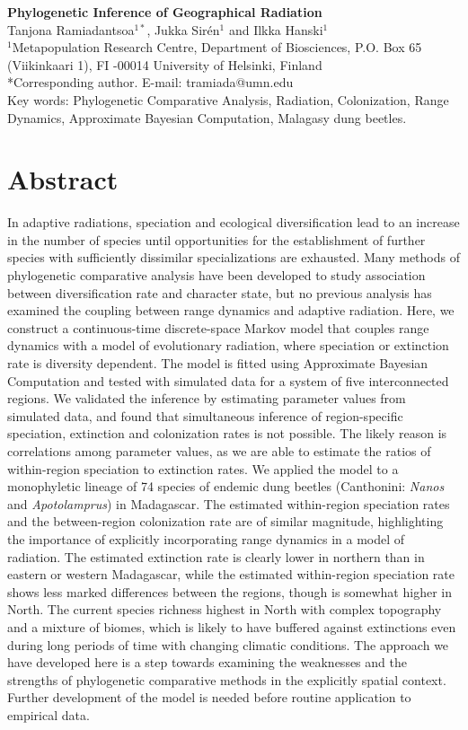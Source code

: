\begin{strip}
{
{\huge \bfseries Phylogenetic Inference of Geographical Radiation} \\ 

Tanjona Ramiadantsoa$^{1*}$, Jukka Sir{\'e}n$^1$ and Ilkka Hanski$^1$ \\

$^1$Metapopulation Research Centre, Department of Biosciences, P.O. Box 65 (Viikinkaari 1), FI -00014 University of Helsinki, Finland \\

*Corresponding author. E-mail: tramiada@umn.edu  \\

Key words: Phylogenetic Comparative Analysis, Radiation, Colonization, Range Dynamics, Approximate Bayesian Computation, Malagasy dung beetles. 
}
\section*{Abstract}
In adaptive radiations, speciation and ecological diversification lead to an increase in the number of species until opportunities for the establishment of further species with sufficiently dissimilar specializations are exhausted. 
Many methods of phylogenetic comparative analysis have been developed to study association between diversification rate and character state, but no previous analysis has examined the coupling between range dynamics and adaptive radiation.  
Here, we construct a continuous-time discrete-space Markov model that couples range dynamics with a model of evolutionary radiation, where speciation or extinction rate is diversity dependent. 
The model is fitted using Approximate Bayesian Computation and tested with simulated data for a system of five interconnected regions. 
We validated the inference by estimating parameter values from simulated data, and found that simultaneous inference of region-specific speciation, extinction and colonization rates is not possible. 
The likely reason is correlations among parameter values, as we are able to estimate the ratios of within-region speciation to extinction rates. 
We applied the model to a monophyletic lineage of 74 species of endemic dung beetles (Canthonini: \textit{Nanos} and \textit{Apotolamprus}) in Madagascar. 
The estimated within-region speciation rates and the between-region colonization rate are of similar magnitude, highlighting the importance of explicitly incorporating range dynamics in a model of radiation. 
The estimated extinction rate is clearly lower in northern than in eastern or western Madagascar, while the estimated within-region speciation rate shows less marked differences between the regions, though is somewhat higher in North. 
The current species richness highest in North with complex topography and a mixture of biomes, which is likely to have buffered against extinctions even during long periods of time with changing climatic conditions. 
The approach we have developed here is a step towards examining the weaknesses and the strengths of phylogenetic comparative methods in the explicitly spatial context. 
Further development of the model is needed before routine application to empirical data.  
\end{strip}
